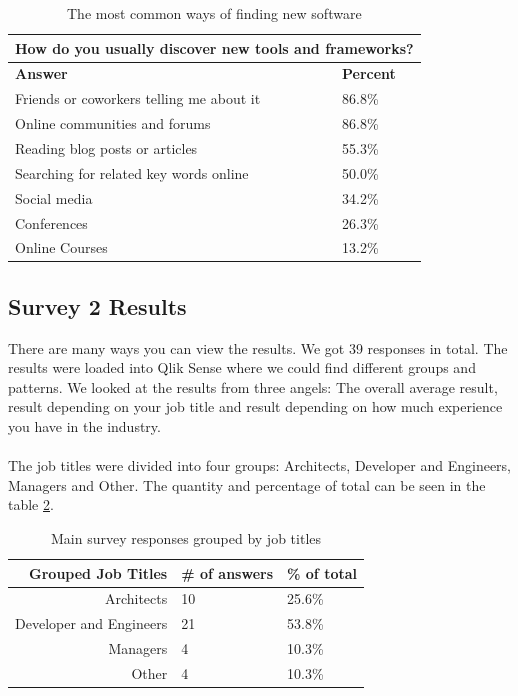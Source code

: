 \documentclass{article}
\begin{document}
\begin{table}[H]
\centering
\begin{tabularx}{\columnwidth}{X|l}
\multicolumn{2}{c}{\textbf{How do you usually discover new tools and frameworks?}} \\ \hline \hline
\textbf{Answer} & \textbf{Percent} \\ \hline
Friends or coworkers telling me about it	&	86.8\% \\
Online communities and forums	&	86.8\% \\
Reading blog posts or articles	&	55.3\% \\
Searching for related key words online	&	50.0\% \\
Social media	&	34.2\% \\
Conferences	&	26.3\% \\
Online Courses	&	13.2\% \\ \hline
\end{tabularx}
\caption{The most common ways of finding new software}
\label{tab:discover}
\end{table}

\subsection{Survey 2 Results}
There are many ways you can view the results.
We got 39 responses in total. The results were loaded into Qlik Sense
where we could find different groups and patterns. We looked at the
results from three angels: The overall average result, result depending
on your job title and result depending on how much experience you have
in the industry.
\\ \\
The job titles were divided into four groups: Architects, Developer and
Engineers, Managers and Other. The quantity and percentage of total can
be seen in the table \ref{tabl:jobs}.

\begin{table}[H]
\centering
\begin{tabularx}{\columnwidth}{r l l}
\textbf{Grouped Job Titles} &    \textbf{\# of answers} &     \textbf{\% of total} \\\hline
Architects              & 10           & 25.6\%  \\ \hline
Developer and Engineers & 21           & 53.8\%  \\\hline
Managers                & 4            & 10.3\%  \\\hline
Other                   & 4            & 10.3\%  \\\hline
\end{tabularx}
\caption{Main survey responses grouped by job titles}
\label{tabl:jobs}
\end{table}
\end{document}
